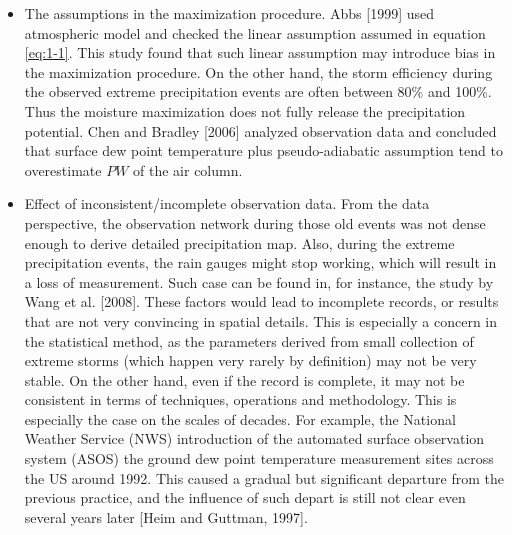 \begin{itemize}
\item The assumptions in the maximization procedure. Abbs [1999] used atmospheric model and checked the linear assumption assumed in equation \ref{eq:1-1}. This study found that such linear assumption may introduce bias in the maximization procedure. On the other hand, the storm efficiency during the observed extreme precipitation events are often between 80\% and 100\%. Thus the moisture maximization does not fully release the precipitation potential. Chen and Bradley [2006] analyzed observation data and concluded that surface dew point temperature plus pseudo-adiabatic assumption tend to overestimate $PW$ of the air column.

\item Effect of inconsistent/incomplete observation data. From the data perspective, the observation network during those old events was not dense enough to derive detailed precipitation map. Also, during the extreme precipitation events, the rain gauges might stop working, which will result in a loss of measurement. Such case can be found in, for instance, the study by Wang et al. [2008]. These factors would lead to incomplete records, or results that are not very convincing in spatial details. This is especially a concern in the statistical method, as the parameters derived from small collection of extreme storms (which happen very rarely by definition) may not be very stable. On the other hand, even if the record is complete, it may not be consistent in terms of techniques, operations and methodology. This is especially the case on the scales of decades. For example, the National Weather Service (NWS) introduction of the automated surface observation system (ASOS) the ground dew point temperature measurement sites across the US around 1992. This caused a gradual but significant departure from the previous practice, and the influence of such depart is still not clear even several years later [Heim and Guttman, 1997].


\end{itemize}
